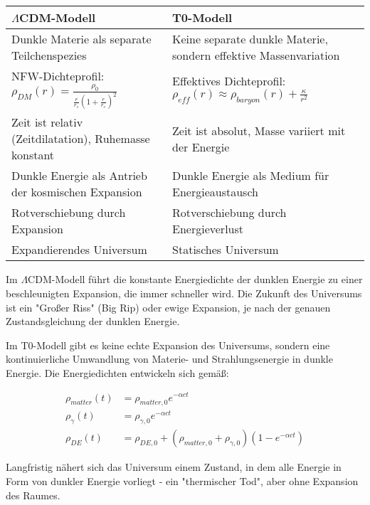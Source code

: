 \documentclass[a4paper,12pt]{article}
\begin{document}
	\begin{tcolorbox}[colback=yellow!5!white,colframe=yellow!75!black,title=Vergleich der Modelle]
		\begin{tabular}{p{}|p{}}
			\toprule
			\textbf{$\Lambda$CDM-Modell} & \textbf{T0-Modell} \\
			\midrule
			Dunkle Materie als separate Teilchenspezies & Keine separate dunkle Materie, sondern effektive Massenvariation \\
			\midrule
			NFW-Dichteprofil: $\rho_{DM}(r) = \frac{\rho_0}{\frac{r}{r_s}(1 + \frac{r}{r_s})^2}$ & Effektives Dichteprofil: $\rho_{eff}(r) \approx \rho_{baryon}(r) + \frac{\kappa}{r^2}$ \\
			\midrule
			Zeit ist relativ (Zeitdilatation), Ruhemasse konstant & Zeit ist absolut, Masse variiert mit der Energie \\
			\midrule
			Dunkle Energie als Antrieb der kosmischen Expansion & Dunkle Energie als Medium für Energieaustausch \\
			\midrule
			Rotverschiebung durch Expansion & Rotverschiebung durch Energieverlust \\
			\midrule
			Expandierendes Universum & Statisches Universum \\
			\bottomrule
		\end{tabular}
	\end{tcolorbox}
	
	Im $\Lambda$CDM-Modell führt die konstante Energiedichte der dunklen Energie zu einer beschleunigten Expansion, die immer schneller wird. Die Zukunft des Universums ist ein "Großer Riss" (Big Rip) oder ewige Expansion, je nach der genauen Zustandsgleichung der dunklen Energie.
	
	Im T0-Modell gibt es keine echte Expansion des Universums, sondern eine kontinuierliche Umwandlung von Materie- und Strahlungsenergie in dunkle Energie. Die Energiedichten entwickeln sich gemäß:
	
	\begin{align}
		\rho_{matter}(t) &= \rho_{matter,0} e^{-\alpha c t} \\
		\rho_{\gamma}(t) &= \rho_{\gamma,0} e^{-\alpha c t} \\
		\rho_{DE}(t) &= \rho_{DE,0} + (\rho_{matter,0} + \rho_{\gamma,0})(1 - e^{-\alpha c t})
	\end{align}
	
	Langfristig nähert sich das Universum einem Zustand, in dem alle Energie in Form von dunkler Energie vorliegt - ein "thermischer Tod", aber ohne Expansion des Raumes.
	
\end{document}
